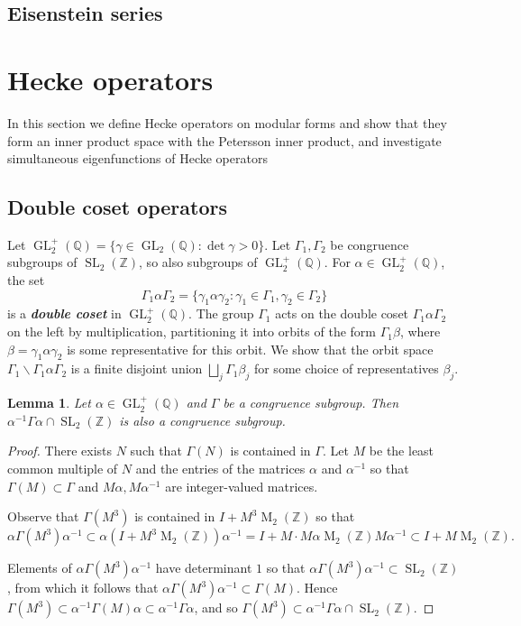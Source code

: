 \documentclass[10pt,leqno,twoside]{article}
\theoremstyle{plain}
\newtheorem{lemma}[lem]{Lemma}
\theoremstyle{definition}
\numberwithin{equation}{section}
\numberwithin{lem}{section}
\newcommand{\textib}[1]{\textbf{\textit{#1\index{#1}}}} %
\DeclareMathOperator{\Mat}{M}
\DeclareMathOperator{\GL}{GL}
\DeclareMathOperator{\SL}{SL}
\newcommand{\slz}{\SL_2(\mathbb{Z})}
\newcommand{\glqp}{\GL_2^+(\mathbb{Q})}
\newcommand{\tbd}{{\Huge\color{red}{\textib{TBD}}}}
\begin{document}
\subsection{Eisenstein series}

\newpage\section{Hecke operators}
In this section we define Hecke operators on modular forms and show that they form an inner product space with the Petersson inner product, and investigate simultaneous eigenfunctions of Hecke operators \tbd
\subsection{Double coset operators}
Let $\glqp = \{\gamma\in \GL_2(\mathbb Q) : \det \gamma >0\}$. Let $\varGamma_1,\varGamma_2$ be congruence subgroups of $\slz$, so also subgroups of $\glqp$. For $\alpha\in\glqp$, the set
\[\varGamma_1\alpha\varGamma_2 = \{\gamma_1\alpha\gamma_2 : \gamma_1\in\varGamma_1, \gamma_2\in\varGamma_2\}\] is a \textib{double coset} in $\glqp$. The group $\varGamma_1$ acts on the double coset $\varGamma_1\alpha\varGamma_2$ on the left by multiplication, partitioning it into orbits of the form $\varGamma_1\beta$, where $\beta = \gamma_1\alpha\gamma_2$ is some representative for this orbit. We show that the orbit space  $\varGamma_1\backslash\varGamma_1\alpha\varGamma_2$ is a finite disjoint union $\bigsqcup_j\varGamma_1\beta_j$ for some choice of representatives $\beta_j$.
\begin{lemma}\label{lem: conjugation congruence subgroup}
    Let $\alpha\in\glqp$ and $\varGamma$ be a congruence subgroup. Then $\alpha^{-1}\varGamma\alpha\cap\slz$ is also a congruence subgroup.
\end{lemma}
\begin{proof}
    There exists $N$ such that $\varGamma(N)$ is contained in $\varGamma$. Let $M$ be the least common multiple of $N$ and the entries of the matrices $\alpha$ and $\alpha^{-1}$ so that $\varGamma(M)\subset \varGamma$ and $M\alpha, M\alpha^{-1}$ are integer-valued matrices.
    
    Observe that $\varGamma(M^3)$ is contained in $I + M^3\Mat_2(\mathbb Z)$ so that 
    \[\alpha\varGamma(M^3)\alpha^{-1}\subset \alpha(I + M^3\Mat_2(\mathbb Z))\alpha^{-1} = I + M\cdot M\alpha \Mat_2(\mathbb Z) M\alpha^{-1}\subset I+M\Mat_2(\mathbb{Z}).\]
    
    Elements of $\alpha\varGamma(M^3)\alpha^{-1}$ have determinant $1$ so that $\alpha\varGamma(M^3)\alpha^{-1}\subset \slz$, from which it follows that $\alpha\varGamma(M^3)\alpha^{-1}\subset \varGamma(M)$. Hence $\varGamma(M^3)\subset \alpha^{-1}\varGamma(M)\alpha \subset \alpha^{-1}\varGamma\alpha$, and so $\varGamma(M^3)\subset \alpha^{-1}\varGamma\alpha\cap \slz$.
\end{proof}
\end{document}
